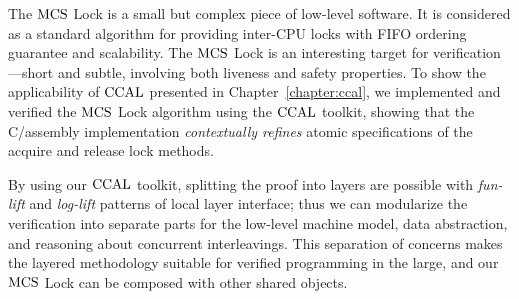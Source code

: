 
The $\mathrm{MCS}$ Lock is a small but complex piece of low-level software.
It is considered as a standard algorithm for providing inter-CPU locks with FIFO ordering guarantee and scalability.
The $\mathrm{MCS}$ Lock is an interesting target for verification---short and subtle, involving both liveness and safety properties. 
To show the applicability of $\mathrm{CCAL}$ presented in Chapter~\ref{chapter:ccal},
we implemented and verified the $\mathrm{MCS}$ Lock algorithm using the $\mathrm{CCAL}$ toolkit, 
showing that the C/assembly implementation {\em contextually refines} atomic specifications of the acquire and release lock methods.

By using our $\mathrm{CCAL}$ toolkit, splitting the proof into layers are possible with  \textit{fun-lift} and \textit{log-lift} patterns of local layer interface;
thus we can modularize the verification into separate parts for the low-level machine model, data abstraction, and reasoning about concurrent interleavings.
This separation of concerns makes the layered methodology suitable for verified programming in the large, and our 
$\mathrm{MCS}$ Lock can be composed with other shared objects.

